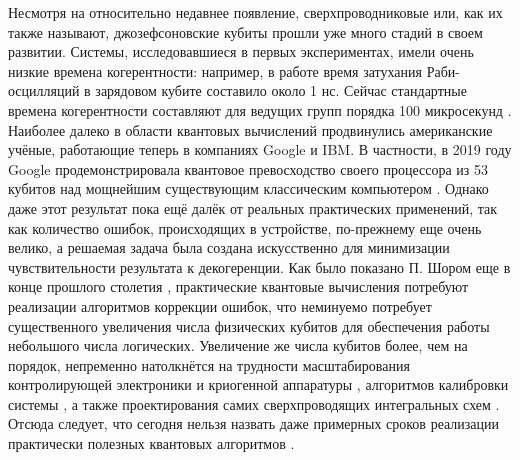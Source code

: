 \documentclass[14pt, a4paper]{extarticle}
\begin{document}
Несмотря на относительно недавнее появление, сверхпроводниковые или, как их также называют, джозефсоновские кубиты прошли уже много стадий в своем развитии. Системы, исследовавшиеся в первых экспериментах, имели очень низкие времена когерентности: например, в работе \cite{nakamura1999coherent} время затухания Раби-осцилляций в зарядовом кубите составило около 1 нс. Сейчас стандартные времена когерентности составляют для ведущих групп порядка 100 микросекунд \cite{kjaergaard2020superconducting}. Наиболее далеко в области квантовых вычислений продвинулись американские учёные, работающие теперь в компаниях Google и IBM. В частности, в 2019 году Google продемонстрировала квантовое превосходство своего процессора из 53 кубитов над мощнейшим существующим классическим компьютером \cite{arute2019quantum}. Однако даже этот результат пока ещё далёк от реальных практических применений, так как количество ошибок, происходящих в устройстве, по-прежнему еще очень велико, а решаемая задача была создана искусственно для минимизации чувствительности результата к декогеренции. Как было показано П. Шором еще в конце прошлого столетия \cite{shor1995scheme}, практические квантовые вычисления потребуют реализации алгоритмов коррекции ошибок, что неминуемо потребует существенного увеличения числа физических кубитов для обеспечения работы небольшого числа логических. Увеличение же числа кубитов более, чем на порядок, непременно натолкнётся на трудности масштабирования контролирующей электроники и криогенной аппаратуры \cite{krinner2019engineering}, алгоритмов калибровки системы \cite{arute2019quantum, kelly2018physical}, а также проектирования самих сверхпроводящих интегральных схем \cite{hutchings2017tunable}. Отсюда следует, что сегодня нельзя назвать даже примерных сроков реализации практически полезных квантовых алгоритмов \cite{arute2019quantum}.
\end{document}
